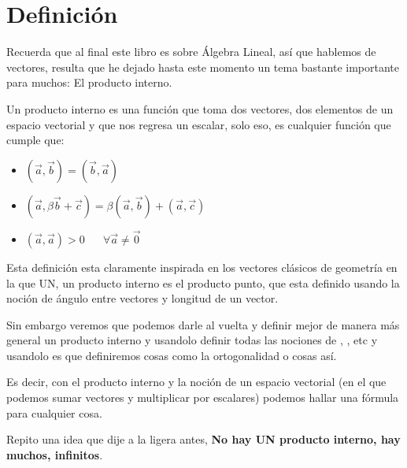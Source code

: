 \documentclass[12pt, fleqn]{report}                             %
\newcommand \Quote              {\qq}                           %
\DeclareMathOperator \Space     {\quad}                         %
\theoremstyle{break}                                            %
\begin{document}
        \section{Definición}

            Recuerda que al final este libro es sobre Álgebra Lineal, así que hablemos de 
            vectores, resulta que he dejado hasta este momento un tema bastante importante
            para muchos: El producto interno.

            Un producto interno es una función que toma dos vectores, dos elementos de un espacio
            vectorial y que nos regresa un escalar, solo eso, es cualquier función que 
            cumple que:
            \begin{large}
                \begin{itemize}
                    \item $(\vec a, \vec b) = (\vec b, \vec a)$
                    \item $(\vec a, \beta \vec b + \vec c) = \beta (\vec a, \vec b) + (\vec a, \vec c)$
                    \item $(\vec a, \vec a) > 0 \Space \forall \vec a \neq \vec 0$
                \end{itemize}
            \end{large}

            Esta definición esta claramente inspirada en los vectores clásicos de geometría
            en la que UN, un producto interno es el producto punto, que esta definido usando 
            la noción de ángulo entre vectores y longitud de un vector.

            Sin embargo veremos que podemos darle al vuelta y definir mejor de manera más general
            un producto interno y usandolo definir todas las nociones de \Quote{longitud}, \Quote{ángulo}, etc 
            y usandolo es que definiremos cosas como la ortogonalidad o cosas así.

            Es decir, con el producto interno y la noción de un espacio vectorial (en el que podemos sumar
            vectores y multiplicar por escalares) podemos hallar una fórmula para cualquier cosa.
        
            Repito una idea que dije a la ligera antes, \textbf{No hay UN producto interno, hay muchos, infinitos}.

            \clearpage
\end{document}
